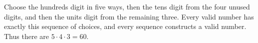Choose the hundreds digit in five ways, then the tens digit from the four unused digits, and then the units digit from the remaining three. Every valid number has exactly this sequence of choices, and every sequence constructs a valid number. Thus there are $5\cdot4\cdot3=\boxed{60}$.
